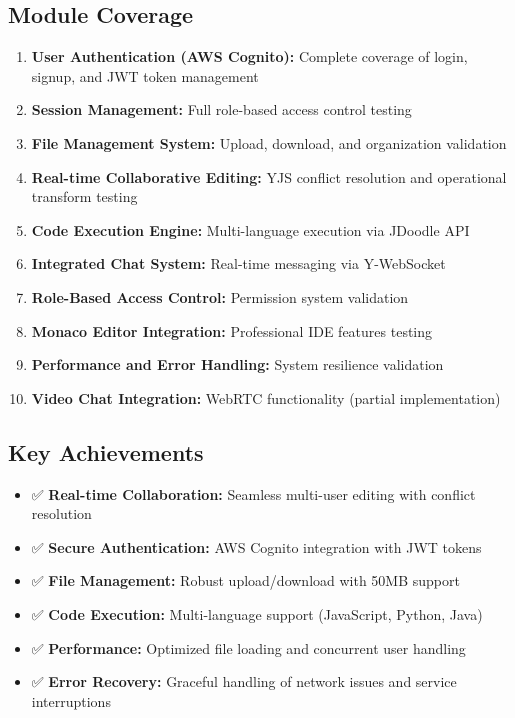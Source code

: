 \subsection{Module Coverage}
\begin{enumerate}
    \item \textbf{User Authentication (AWS Cognito):} Complete coverage of login, signup, and JWT token management
    \item \textbf{Session Management:} Full role-based access control testing
    \item \textbf{File Management System:} Upload, download, and organization validation
    \item \textbf{Real-time Collaborative Editing:} YJS conflict resolution and operational transform testing
    \item \textbf{Code Execution Engine:} Multi-language execution via JDoodle API
    \item \textbf{Integrated Chat System:} Real-time messaging via Y-WebSocket
    \item \textbf{Role-Based Access Control:} Permission system validation
    \item \textbf{Monaco Editor Integration:} Professional IDE features testing
    \item \textbf{Performance and Error Handling:} System resilience validation
    \item \textbf{Video Chat Integration:} WebRTC functionality (partial implementation)
\end{enumerate}

\subsection{Key Achievements}
\begin{itemize}
    \item ✅ \textbf{Real-time Collaboration:} Seamless multi-user editing with conflict resolution
    \item ✅ \textbf{Secure Authentication:} AWS Cognito integration with JWT tokens
    \item ✅ \textbf{File Management:} Robust upload/download with 50MB support
    \item ✅ \textbf{Code Execution:} Multi-language support (JavaScript, Python, Java)
    \item ✅ \textbf{Performance:} Optimized file loading and concurrent user handling
    \item ✅ \textbf{Error Recovery:} Graceful handling of network issues and service interruptions
\end{itemize}

